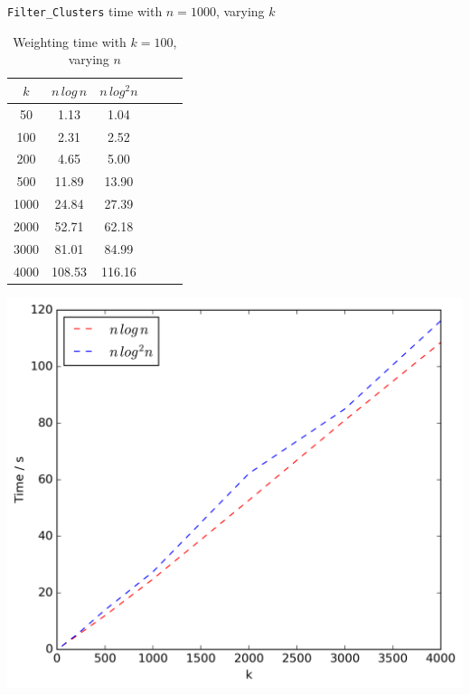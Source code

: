 \documentclass{article}
\begin{document}
\begin{table}[!ht]
\begin{minipage}{0.48\textwidth}
            \vspace{0.5cm}
        \end{minipage}\hfill
        \begin{minipage}{0.48\textwidth}
            \centering
            \caption{\texttt{Filter\_Clusters} time with $n = 1000$, varying $k$}
            \label{tab:filterk1}
            \begin{tabular}{c||ccccc}
                $k$ & $n\,log\,n$ & $n\,log^2n$\\
                \hline\hline
                50 & 1.13 & 1.04\\
                100 & 2.31 & 2.52\\
                200 & 4.65 & 5.00\\
                500 & 11.89 & 13.90\\
                1000 & 24.84 & 27.39\\
                2000 & 52.71 & 62.18\\
                3000 & 81.01 & 84.99\\
                4000 & 108.53 & 116.16\\
            \end{tabular}
            \includegraphics[scale=0.4]{varyingk1_filter}
            \vspace{0.5cm}
        \end{minipage}
        \begin{minipage}{0.48\textwidth}
            \centering
            \caption{Weighting time with $k = 100$, varying $n$}

\end{minipage}
\end{table}
\end{document}
